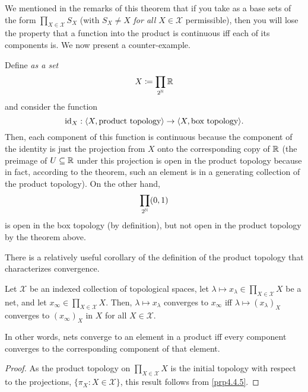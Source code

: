 We mentioned in the remarks of this theorem that if you take as a base sets of the form $\prod _{X\in \mathcal{X}}S_X$ (with $S_X\neq X$ \emph{for all $X\in \mathcal{X}$} permissible), then you will lose the property that a function into the product is continuous iff each of its components is.  We now present a counter-example.
\begin{exm}\label{exm4.5.20}
Define \emph{as a set}
\begin{equation}
X\coloneqq \prod _{2^{\mathbb{N}}}\mathbb{R} 
\end{equation}
and consider the function
\begin{equation}
\operatorname{id} _X:\langle X,\text{product topology}\rangle\rightarrow \langle X,\text{box topology}\rangle.
\end{equation}
Then, each component of this function is continuous because the component of the identity is just the projection from $X$ onto the corresponding copy of $\mathbb{R}$ (the preimage of $U\subseteq \mathbb{R}$ under this projection is open in the product topology because in fact, according to the theorem, such an element is in a generating collection of the product topology).  On the other hand,
\begin{equation}
\prod _{2^{\mathbb{N}}}(0,1)
\end{equation}
is open in the box topology (by definition), but not open in the product topology by the theorem above.
\end{exm}
There is a relatively useful corollary of the definition of the product topology that characterizes convergence.
\begin{crl}\label{crl4.5.15}
Let $\mathcal{X}$ be an indexed collection of topological spaces, let $\lambda \mapsto x_\lambda \in \prod _{X\in \mathcal{X}}X$ be a net, and let $x_\infty \in \prod _{X\in \mathcal{X}}X$.  Then, $\lambda \mapsto x_\lambda$ converges to $x_\infty$ iff $\lambda \mapsto (x_\lambda )_X$ converges to $(x_\infty )_X$ in $X$ for all $X\in \mathcal{X}$.
\begin{rmk}
In other words, nets converge to an element in a product iff every component converges to the corresponding component of that element.
\end{rmk}
\begin{proof}
As the product topology on $\prod _{X\in \mathcal{X}}X$ is the initial topology with respect to the projections, $\{ \pi _X:X\in \mathcal{X}\}$, this result follows from \cref{prp4.4.5}.
\end{proof}
\end{crl}

